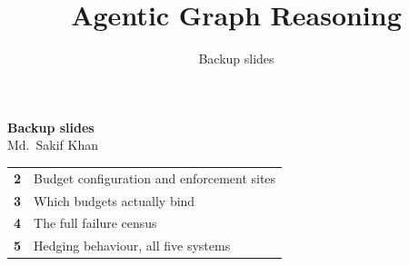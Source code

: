 %
%


\title{Agentic Graph Reasoning}
\subtitle{Backup slides}



{
\begin{frame}[plain]
  \vfill
  \centering
  {\Large\bfseries\color{agrdark} Backup slides}\\[3mm]
  {\large Md.\ Sakif Khan }\\[6mm]
  \begin{minipage}{0.72\textwidth}
    \small
    \begin{tabular}{@{}rL{76mm}@{}}
      \textbf{2} & Budget configuration and enforcement sites \\
      \textbf{3} & Which budgets actually bind \\
      \textbf{4} & The full failure census \\
      \textbf{5} & Hedging behaviour, all five systems \\
    \end{tabular}
  \end{minipage}
  \vfill
\end{frame}}



